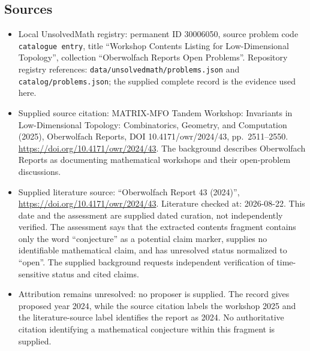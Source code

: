 \documentclass[11pt]{article}
\begin{document}
\subsection{Sources}
\begin{itemize}
\item Local UnsolvedMath registry: permanent ID 30006050, source problem code \texttt{catalogue entry}, title ``Workshop Contents Listing for Low-Dimensional Topology'', collection ``Oberwolfach Reports Open Problems''. Repository registry references: \texttt{data/unsolvedmath/problems.json} and \texttt{catalog/problems.json}; the supplied complete record is the evidence used here.
\item Supplied source citation: MATRIX-MFO Tandem Workshop: Invariants in Low-Dimensional Topology: Combinatorics, Geometry, and Computation (2025), Oberwolfach Reports, DOI 10.4171/owr/2024/43, pp.\ 2511--2550. \url{https://doi.org/10.4171/owr/2024/43}. The background describes Oberwolfach Reports as documenting mathematical workshops and their open-problem discussions.
\item Supplied literature source: ``Oberwolfach Report 43 (2024)'', \url{https://doi.org/10.4171/owr/2024/43}. Literature checked at: 2026-08-22. This date and the assessment are supplied dated curation, not independently verified. The assessment says that the extracted contents fragment contains only the word ``conjecture'' as a potential claim marker, supplies no identifiable mathematical claim, and has unresolved status normalized to ``open''. The supplied background requests independent verification of time-sensitive status and cited claims.
\item Attribution remains unresolved: no proposer is supplied. The record gives proposed year 2024, while the source citation labels the workshop 2025 and the literature-source label identifies the report as 2024. No authoritative citation identifying a mathematical conjecture within this fragment is supplied.
\end{itemize}
\end{document}
